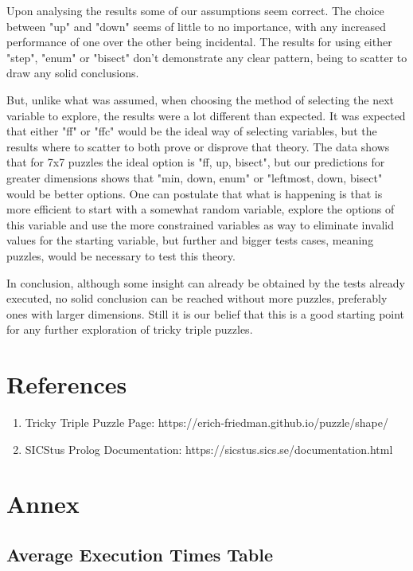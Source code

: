 \documentclass[runningheads]{llncs}
\begin{document}
Upon analysing the results some of our assumptions seem correct. The choice between "up"
and "down" seems of little to no importance, with any increased performance of one over the
other being incidental. The results for using either "step", "enum" or "bisect" don't
demonstrate any clear pattern, being to scatter to draw any solid conclusions.

But, unlike what was assumed, when choosing the method of selecting the next variable to explore,
the results were a lot different than expected. It was expected that either "ff" or "ffc"
would be the ideal way of selecting variables, but the results where to scatter to both prove
or disprove that theory. The data shows that for 7x7 puzzles the ideal option is "ff, up, bisect",
but our predictions for greater dimensions shows that "min, down, enum" or "leftmost, down, bisect"
would be better options. One can postulate that what is happening is that is more efficient to start
with a somewhat random variable, explore the options of this variable and use the more constrained
variables as way to eliminate invalid values for the starting variable, but further and bigger tests
cases, meaning puzzles, would be necessary to test this theory.

In conclusion, although some insight can already be obtained by the tests already executed, no
solid conclusion can be reached without more puzzles, preferably ones with larger dimensions.
Still it is our belief that this is a good starting point for any further exploration of tricky
triple puzzles.

\section{References}
\begin{enumerate}
    \item Tricky Triple Puzzle Page: https://erich-friedman.github.io/puzzle/shape/
    \item SICStus Prolog Documentation: https://sicstus.sics.se/documentation.html
\end{enumerate}

\newpage
\section{Annex}

\subsection{Average Execution Times Table} \label{experiment-results}
\end{document}
